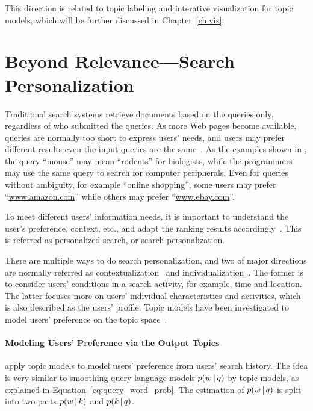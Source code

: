 This direction is related to topic labeling and
interative visualization for topic models, which will be further
discussed in Chapter~\ref{ch:viz}.

\section{Beyond Relevance---Search Personalization}

Traditional search systems retrieve documents based on the queries
only, regardless of who submitted the queries.  As more Web pages
become available, queries are normally too short to express users'
needs, and users may prefer different results even the input queries
are the same~\citep{Jansen-2000,Dou-2007}.  As the examples shown in
\citet{Dou-2007}, the query ``mouse'' may mean ``rodents'' for
biologists, while the programmers may use the same query to search for
computer peripherals. Even for queries without ambiguity, for example
``online shopping'', some users may prefer ``\url{www.amazon.com}''
while others may prefer ``\url{www.ebay.com}''.

To meet different users' information needs, it is important to
understand the user's preference, context, etc., and adapt the ranking
results accordingly~\citep{Pitkow-2002,Micarelli-2007}.  This is
referred as personalized search, or search personalization.

There are multiple ways to do search personalization, and two of major
directions are normally referred as
contextualization~\citep{Melucci-2012} and
individualization~\citep{Pitkow-2002}. The former is to consider
users' conditions in a search activity, for example, time and
location.  The latter focuses more on users' individual
characteristics and activities, which is also described as the users'
profile.  Topic models have been investigated to model users'
preference on the topic space~\citep{Song-2010,Carman-2010}.

\paragraph{Modeling Users' Preference via the Output Topics}

\citet{Song-2010} apply topic models to model users' preference from
users' search history. The idea is very similar to smoothing query
language models $p(w \, | \, q)$ by topic models, as explained in
Equation~\ref{eq:query_word_prob}. The estimation of $p(w \, | \, q)$ is
split into two parts $p(w \, | \, k)$ and $p(k \, | \, q)$.

